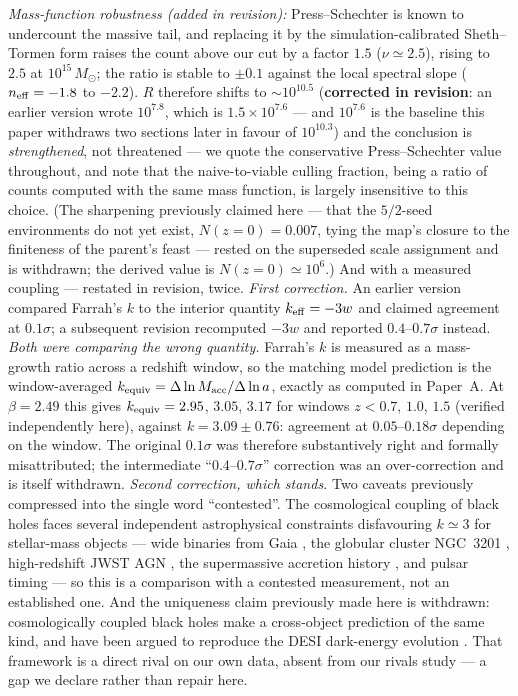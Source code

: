 \documentclass[11pt]{article}
\begin{document}
\emph{Mass-function robustness (added in revision):} Press--Schechter is known to undercount the massive tail, and replacing it by the simulation-calibrated Sheth--Tormen form \cite{ST1999} raises the count above our cut by a factor $1.5$ ($\nu \simeq 2.5$), rising to $2.5$ at $10^{15}\,M_\odot$; the ratio is stable to $\pm 0.1$ against the local spectral slope ($n_{\rm eff} = -1.8$ to $-2.2$). $R$ therefore shifts to $\sim 10^{10.5}$ (\textbf{corrected in revision}: an earlier version wrote $10^{7.8}$, which is $1.5 \times 10^{7.6}$ --- and $10^{7.6}$ is the baseline this paper withdraws two sections later in favour of $10^{10.3}$) and the conclusion is \emph{strengthened}, not threatened --- we quote the conservative Press--Schechter value throughout, and note that the naive-to-viable culling fraction, being a ratio of counts computed with the same mass function, is largely insensitive to this choice. (The sharpening previously claimed here --- that the $5/2$-seed environments do not yet exist, $N(z=0) = 0.007$, tying the map's closure to the finiteness of the parent's feast --- rested on the superseded scale assignment and is withdrawn; the derived value is $N(z=0) \simeq 10^{6}$.) And with a measured coupling --- restated in revision, twice. \emph{First correction.} An earlier
version compared Farrah's $k$ \cite{Farrah2023} to the interior quantity $k_{\rm eff} = -3w$ and claimed agreement at
$0.1\sigma$; a subsequent revision recomputed $-3w$ and reported $0.4$--$0.7\sigma$ instead.
\emph{Both were comparing the wrong quantity.} Farrah's $k$ is measured as a mass-growth ratio
across a redshift window, so the matching model prediction is the window-averaged
$k_{\rm equiv} = \Delta\ln M_{\rm acc}/\Delta\ln a$, exactly as computed in Paper~A. At $\beta =
2.49$ this gives $k_{\rm equiv} = 2.95$, $3.05$, $3.17$ for windows $z < 0.7$, $1.0$, $1.5$
(verified independently here), against $k = 3.09 \pm 0.76$: agreement at $0.05$--$0.18\sigma$
depending on the window. The original $0.1\sigma$ was therefore substantively right and formally
misattributed; the intermediate ``$0.4$--$0.7\sigma$'' correction was an over-correction and is
itself withdrawn. \emph{Second correction, which stands.} Two caveats previously compressed into
the single word ``contested''. The cosmological coupling of black holes faces several independent
astrophysical constraints disfavouring $k \simeq 3$ for stellar-mass objects --- wide binaries from
Gaia \cite{AndraeElBadry2023}, the globular cluster NGC~3201 \cite{Rodriguez2023}, high-redshift
JWST AGN \cite{Lei2024}, the supermassive accretion history \cite{Lacy2024}, and pulsar timing
\cite{Calza2024} --- so this is a comparison with a contested measurement, not an established one.
And the uniqueness claim previously made here is withdrawn: cosmologically coupled black holes make
a cross-object prediction of the same kind, and have been argued to reproduce the DESI dark-energy
evolution \cite{Croker2024}. That framework is a direct rival on our own data, absent from our
rivals study --- a gap we declare rather than repair here.
\end{document}
